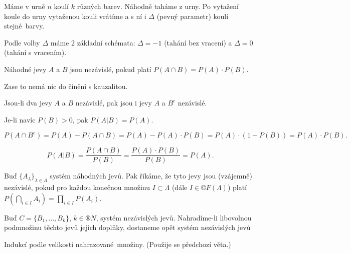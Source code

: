 \documentclass[12pt]{article}					%
\begin{document}
\begin{priklad}
	Máme v urně $n$ koulí $k$ různých barev. Náhodně taháme z urny. Po vytažení koule do urny vytaženou kouli vrátíme a s ní i $\Delta$ (pevný parametr) koulí stejné barvy.

	Podle volby $\Delta$ máme 2 základní schémata: $\Delta = -1$ (tahání bez vracení) a $\Delta = 0$ (tahání s vracením).
\end{priklad}


\begin{definice}
	Náhodné jevy $A$ a $B$ jsou nezávislé, pokud platí $P(A \cap B) = P(A)·P(B)$.
\end{definice}

\begin{upozorneni}
	Zase to nemá nic do činění s kauzalitou.
\end{upozorneni}

\begin{veta}
	Jsou-li dva jevy $A$ a $B$ nezávislé, pak jsou i jevy $A$ a $B^c$ nezávislé.

	Je-li navíc $P(B) > 0$, pak $P(A|B) = P(A)$.

	\begin{dukazin}
		$$ P(A \cap B^c) = P(A) - P(A \cap B) = P(A) - P(A)·P(B) = P(A)·(1 - P(B)) = P(A)·P(B). $$

		$$ P(A|B) = \frac{P(A \cap B)}{P(B)} = \frac{P(A)·P(B)}{P(B)} = P(A). $$
	\end{dukazin}
\end{veta}

\begin{definice}
	Buď $\{A_\lambda\}_{\lambda \in \Lambda}$ systém náhodných jevů. Pak říkáme, že tyto jevy jsou (vzájemně) nezávislé, pokud pro každou konečnou množinu $I \subset \Lambda$ (dále $I \in ©F(\Lambda)$) platí $P(\bigcap_{i \in I} A_i) = \prod_{i \in I} P(A_i)$.
\end{definice}

\begin{veta}
	Buď $C = \{B_1, …, B_k\}$, $k \in ®N$, systém nezávislých jevů. Nahradíme-li libovolnou podmnožinu těchto jevů jejich doplňky, dostaneme opět systém nezávislých jevů

	\begin{dukazin}
		Indukcí podle velikosti nahrazované množiny. (Použije se předchozí věta.)
	\end{dukazin}
\end{veta}
\end{document}

